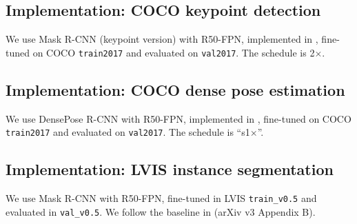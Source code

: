 \documentclass[10pt,twocolumn,letterpaper]{article}
\def\x{\times}
\begin{document}
\subsection{Implementation: COCO keypoint detection}
We use Mask R-CNN (keypoint version) with R50-FPN, implemented in \cite{Wu2019}, fine-tuned on COCO \texttt{train2017} and evaluated on \texttt{val2017}. The schedule is 2$\x$.

\subsection{Implementation: COCO dense pose estimation}
We use DensePose R-CNN \cite{AlpGueler2018} with R50-FPN, implemented in \cite{Wu2019}, fine-tuned on COCO \texttt{train2017} and evaluated on \texttt{val2017}.
The schedule is ``s1$\x$''.

\subsection{Implementation: LVIS instance segmentation}

We use Mask R-CNN with R50-FPN, fine-tuned in LVIS \cite{Gupta2019} \texttt{train\_v0.5} and evaluated in \texttt{val\_v0.5}. We follow the baseline in \cite{Gupta2019} (arXiv v3 Appendix B).
\end{document}

